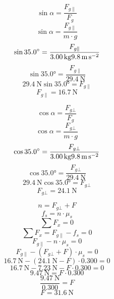\documentclass[../practica.root.tex]{subfiles}
\begin{document}
\begin{enumerate}
	      \begin{multicols}{2}
		      \begin{center}
			      \[ \sin\alpha = \frac{F_{g\parallel}}{F_g} \]
			      \[ \sin\alpha = \frac{F_{g\parallel}}{m\cdot g} \]
			      \[ \sin\ang{35,0} = \frac{F_{g\parallel}}{\SI{3,00}{\kilogram}\gravity[per-mode=reciprocal]} \]
			      \[ \sin\ang{35,0} = \frac{F_{g\parallel}}{\SI{29,4}{\newton}} \]
			      \[ \SI{29,4}{\newton}\sin\ang{35,0} = F_{g\parallel} \]
			      \[ F_{g\parallel} = \SI{16,7}{\newton} \]
		      \end{center}
		      \begin{center}
			      \[ \cos\alpha = \frac{F_{g\bot}}{F_g} \]
			      \[ \cos\alpha = \frac{F_{g\bot}}{m\cdot g} \]
			      \[ \cos\ang{35,0} = \frac{F_{g\bot}}{\SI{3,00}{\kilogram}\gravity[per-mode=reciprocal]} \]
			      \[ \cos\ang{35,0} = \frac{F_{g\bot}}{\SI{29,4}{\newton}} \]
			      \[ \SI{29,4}{\newton}\cos\ang{35,0} = F_{g\bot} \]
			      \[ F_{g\bot} = \SI{24,1}{\newton} \]
		      \end{center}
	      \end{multicols}
	      \begin{center}
		      \[ n = F_{g\bot} + F \]
		      \[ f_s = n\cdot\mu_s \]
		      \[ \sum F_x = 0 \]
		      \[ \sum F_x = F_{g\parallel} - f_s = 0 \]
		      \[ F_{g\parallel} - n\cdot\mu_s = 0 \]
		      \[ F_{g\parallel} - (F_{g\bot} + F)\cdot\mu_s = 0 \]
		      \[ \SI{16,7}{\newton} - (\SI{24,1}{\newton} - F)\cdot\num{0,300} = 0 \]
		      \[ \SI{16,7}{\newton} - \SI{7,23}{\newton} - F\cdot\num{0,300} = 0 \]
		      \[ \SI{9,47}{\newton} = F\cdot\num{0,300} \]
		      \[ \frac{\SI{9,47}{\newton}}{\num{0,300}} = F \]
		      \[ \boxed{F = \SI{31,6}{\newton}} \]
	      \end{center}


\end{enumerate}
\end{document}
